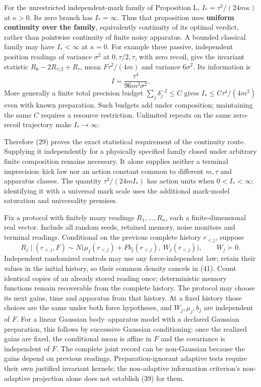 \documentclass[11pt,a4paper]{article}
\begin{document}
For the unrestricted independent-mark family of Proposition L,
\(I_*=\tau^3/(24m\kappa)\) at \(\kappa>0\). Its zero branch has
\(I_*=\infty\). Thus that proposition uses \textbf{uniform continuity
over the family}, equivalently continuity of its optimal verdict, rather
than pointwise continuity of finite noisy apparatus. A bounded classical
family may have \(I_*<\infty\) at \(\kappa=0\). For example three
passive, independent position readings of variance \(\sigma^2\) at
\(0,\tau/2,\tau\), with zero recoil, give the invariant statistic
\(R_0-2R_{\tau/2}+R_\tau\), mean \(F\tau^2/(4m)\) and variance
\(6\sigma^2\). Its information is \[I=\frac{\tau^4}{96m^2\sigma^2}.\]
More generally a finite total precision budget
\(\sum_j\delta_j^{-2}\le C\) gives \(I_*\le C\tau^4/(4m^2)\) even with
known preparation. Such budgets add under composition; maintaining the
same \(C\) requires a resource restriction. Unlimited repeats on the
same zero-recoil trajectory make \(I_*\to\infty\).

Therefore (29) proves the exact statistical requirement of the
continuity route. Supplying it independently for a physically specified
family closed under arbitrary finite composition remains necessary. It
alone supplies neither a terminal imprecision--kick law nor an action
constant common to different \(m,\tau\) and apparatus classes. The
quantity \(\tau^3/(24mI_*)\) has action units when \(0<I_*<\infty\);
identifying it with a universal mark scale uses the additional
mark-model saturation and universality premises.

Fix a protocol with finitely many readings \(R_1,\ldots,R_n\), each a
finite-dimensional real vector. Include all random seeds, retained
memory, noise monitors and terminal readings. Conditional on the
previous complete history \(r_{<j}\), suppose \[R_j\mid(r_{<j},F)\sim
N\bigl(\mu_j(r_{<j})+F b_j(r_{<j}),\ W_j(r_{<j})\bigr),
\qquad W_j\succ0.\tag{39}\] Independent randomized controls may use any
force-independent law; retain their values in the initial history, so
their common density cancels in (41). Count identical copies of an
already stored reading once; deterministic memory functions remain
recoverable from the complete history. The protocol may choose its next
gains, time and apparatus from that history. At a fixed history those
choices are the same under both force hypotheses, and \(W_j,\mu_j,b_j\)
are independent of \(F\). For a linear Gaussian body--apparatus model
with a declared Gaussian preparation, this follows by successive
Gaussian conditioning: once the realized gains are fixed, the
conditional mean is affine in \(F\) and the covariance is independent of
\(F\). The complete joint record can be non-Gaussian because the gains
depend on previous readings. Preparation-ignorant adaptive tests require
their own justified invariant kernels; the non-adaptive information
criterion's non-adaptive projection alone does not establish (39) for
them.
\end{document}
